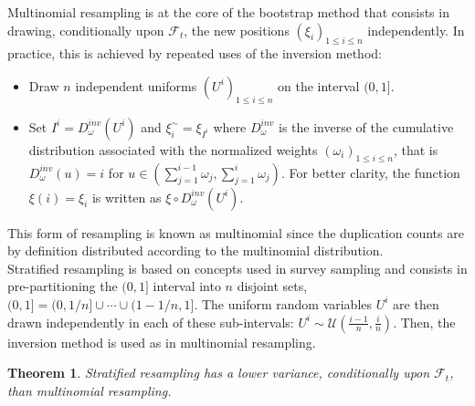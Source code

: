 \documentclass[11pt,a4,twosided,singlespacing,titlepagenumber=on]{scrreprt}
\numberwithin{equation}{chapter} %
\newtheorem{theorem}{Theorem}%
\theoremstyle{remark}
\begin{document}
\noindent
Multinomial resampling is at the core of the bootstrap method that consists in drawing, conditionally upon $\mathcal{F}_t$, the new positions $\left( \xi_i \right)_{1 \leq i \leq n}$ independently. In practice, this is achieved by repeated uses of the inversion method:
\begin{itemize}
\item Draw $n$ independent uniforms $(U^i)_{1 \leq i \leq n}$ on the interval $(0, 1]$.
\item Set $I^i = D_\omega^{inv}(U^i)$ and $\xi_i^\sim = \xi_{I^i}$ where $D_\omega^{inv}$ is the inverse of the cumulative distribution associated with the normalized weights $\left( \omega_i \right)_{1 \leq i \leq n}$, that is $D_\omega^{inv}(u) = i$ for $u \in \left( \sum_{j=1}^{i-1} \omega_j, \sum_{j=1}^i \omega_j \right)$. For better clarity, the function $\xi(i) = \xi_i$ is written as $\xi \circ D_\omega^{inv}(U^i)$.
\end{itemize}
This form of resampling is known as multinomial since the duplication counts are by definition distributed according to the multinomial distribution. \\

\noindent
Stratified resampling is based on concepts used in survey sampling and consists in pre-partitioning the $(0,1]$ interval into $n$ disjoint sets, $(0,1] = (0, 1/n] \cup \cdots \cup (1-1/n, 1]$. The uniform random variables $U^i$ are then drawn independently in each of these sub-intervals: $U^i \sim \mathcal{U}\left( \frac{i-1}{n}, \frac{i}{n} \right)$. Then, the inversion method is used as in multinomial resampling.

\begin{theorem}
\textit{
Stratified resampling has a lower variance, conditionally upon $\mathcal{F}_t$, than multinomial resampling.
}
\end{theorem}
\end{document}
